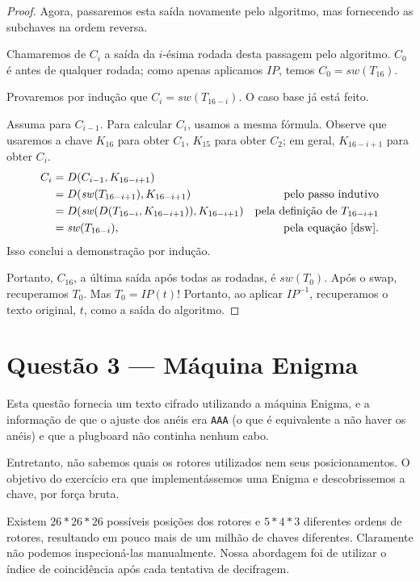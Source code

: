 \documentclass{article}
\newcommand{\sw}{\mathit{sw}}
\newcommand{\IP}{\mathit{IP}}
\begin{document}
\begin{proof}
    Agora, passaremos esta saída novamente pelo algoritmo,
    mas fornecendo as subchaves na ordem reversa.

    Chamaremos de $C_i$ a saída da $i$-ésima rodada
    desta passagem pelo algoritmo.
    $C_0$ é antes de qualquer rodada;
    como apenas aplicamos $\IP$,
    temos $C_0 = \sw(T_{16})$.

    Provaremos por indução que $C_i = \sw(T_{16-i})$.
    O caso base já está feito.

    Assuma para $C_{i-1}$.
    Para calcular $C_i$,
    usamos a mesma fórmula.
    Observe que usaremos a chave $K_{16}$ para obter $C_1$,
    $K_{15}$ para obter $C_2$;
    em geral, $K_{16 - i + 1}$ para obter $C_i$.
    \begin{align*}
        C_i &= D(C_{i-1}, K_{16-i+1}) \\
            &= D(\sw(T_{16-i+1}), K_{16-i+1})   & \text{pelo passo indutivo} \\
            &= D(\sw(D(T_{16-i}, K_{16-i+1})), K_{16-i+1}) &
                \text{pela definição de $T_{16-i+1}$} \\
            &= \sw(T_{16-i}), &\text{pela equação \ref{dsw}}.
    \end{align*}
    Isso conclui a demonstração por indução.

    Portanto, $C_{16}$, a última saída após todas as rodadas,
    é $\sw(T_0)$.
    Após o swap, recuperamos $T_0$.
    Mas $T_0 = \IP(t)$!
    Portanto, ao aplicar $\IP^{-1}$,
    recuperamos o texto original, $t$,
    como a saída do algoritmo.
\end{proof}

\section{Questão 3 --- Máquina Enigma}

Esta questão fornecia um texto cifrado utilizando a máquina Enigma,
e a informação de que o ajuste dos anéis era \texttt{AAA}
(o que é equivalente a não haver os anéis)
e que a plugboard não continha nenhum cabo.

Entretanto, não sabemos quais os rotores utilizados
nem seus posicionamentos.
O objetivo do exercício era que implementássemos uma Enigma
e descobrissemos a chave, por força bruta.

Existem $26*26*26$ possíveis posições dos rotores
e $5*4*3$ diferentes ordens de rotores,
resultando em pouco mais de um milhão de chaves diferentes.
Claramente não podemos inspecioná-las manualmente.
Nossa abordagem foi de utilizar o índice de coincidência
após cada tentativa de decifragem.
\end{document}
